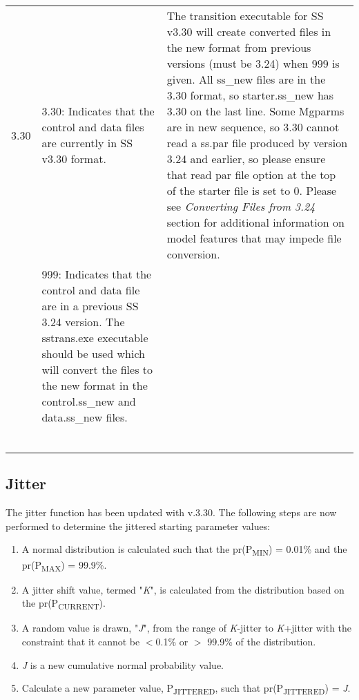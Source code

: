 \begin{landscape}
\begin{longtable}{p{1.5cm} p{7cm} p{12.5cm}}
 \hline
 \hypertarget{Convert}{3.30} & 3.30: Indicates that the control and data files are currently in SS v3.30 format. 
	 & \multirow{1}{1cm}[-0.1cm]{\parbox{12.5cm}{The transition executable for SS v3.30 will create converted files in the new format from previous versions (must be 3.24) when 999 is given.  All ss\_new files are in the 3.30 format, so starter.ss\_new has 3.30 on the last line.  Some Mgparms are in new sequence, so 3.30 cannot read a ss.par file produced by version 3.24 and earlier, so please ensure that read par file option at the top of the starter file is set to 0. Please see \hypertarget{ConvIssues} {\textit{Converting Files from 3.24} section for additional information on model features that may impede file conversion.}}}\\
     & \multirow{1}{1cm}[-0.1cm]{\parbox{7cm}{999: Indicates that the control and data file are in a previous SS 3.24 version.  The sstrans.exe executable should be used which will convert the files to the new format in the control.ss\_new and data.ss\_new files.}}  & \\  
     & & \\  
	 & & \\
     & & \\
   	 & & \\
     & & \\
     & & \\	
\end{longtable}
\end{landscape}
\restoregeometry

\subsection{Jitter}
\hypertarget{Jitter}{}
The jitter function has been updated with v.3.30.  The following steps are now performed to determine the jittered starting parameter values:
\begin{enumerate}
	\item A normal distribution is calculated such that the pr(P\textsubscript{MIN}) = 0.01\% and the pr(P\textsubscript{MAX}) = 99.9\%.
	\item A jitter shift value, termed "\textit{K}", is calculated from the distribution based on the pr(P\textsubscript{CURRENT}).
	\item A random value is drawn, "\textit{J}", from the range of \textit{K}-jitter to \textit{K}+jitter with the constraint that it cannot be $<$0.1\% or $>$ 99.9\% of the distribution.
	\item \textit{J} is a new cumulative normal probability value.
	\item Calculate a new parameter value, P\textsubscript{JITTERED}, such that pr(P\textsubscript{JITTERED}) = \textit{J}.
\end{enumerate}

